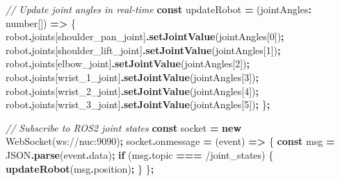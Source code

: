 \documentclass[
]{article}
\newenvironment{Shaded}{\begin{snugshade}}{\end{snugshade}}
\newcommand{\AttributeTok}[1]{\textcolor[rgb]{0.13,0.29,0.53}{#1}}
\newcommand{\BuiltInTok}[1]{#1}
\newcommand{\CommentTok}[1]{\textcolor[rgb]{0.56,0.35,0.01}{\textit{#1}}}
\newcommand{\ControlFlowTok}[1]{\textcolor[rgb]{0.13,0.29,0.53}{\textbf{#1}}}
\newcommand{\DataTypeTok}[1]{\textcolor[rgb]{0.13,0.29,0.53}{#1}}
\newcommand{\DecValTok}[1]{\textcolor[rgb]{0.00,0.00,0.81}{#1}}
\newcommand{\FunctionTok}[1]{\textcolor[rgb]{0.13,0.29,0.53}{\textbf{#1}}}
\newcommand{\KeywordTok}[1]{\textcolor[rgb]{0.13,0.29,0.53}{\textbf{#1}}}
\newcommand{\NormalTok}[1]{#1}
\newcommand{\OperatorTok}[1]{\textcolor[rgb]{0.81,0.36,0.00}{\textbf{#1}}}
\newcommand{\StringTok}[1]{\textcolor[rgb]{0.31,0.60,0.02}{#1}}
\begin{document}
\begin{Shaded}
\begin{Highlighting}[]
  \CommentTok{// Update joint angles in real{-}time}
  \KeywordTok{const}\NormalTok{ updateRobot }\OperatorTok{=}\NormalTok{ (jointAngles}\OperatorTok{:} \DataTypeTok{number}\NormalTok{[]) }\KeywordTok{=\textgreater{}}\NormalTok{ \{}
\NormalTok{    robot}\OperatorTok{.}\AttributeTok{joints}\NormalTok{[}\StringTok{\textquotesingle{}shoulder\_pan\_joint\textquotesingle{}}\NormalTok{]}\OperatorTok{.}\FunctionTok{setJointValue}\NormalTok{(jointAngles[}\DecValTok{0}\NormalTok{])}\OperatorTok{;}
\NormalTok{    robot}\OperatorTok{.}\AttributeTok{joints}\NormalTok{[}\StringTok{\textquotesingle{}shoulder\_lift\_joint\textquotesingle{}}\NormalTok{]}\OperatorTok{.}\FunctionTok{setJointValue}\NormalTok{(jointAngles[}\DecValTok{1}\NormalTok{])}\OperatorTok{;}
\NormalTok{    robot}\OperatorTok{.}\AttributeTok{joints}\NormalTok{[}\StringTok{\textquotesingle{}elbow\_joint\textquotesingle{}}\NormalTok{]}\OperatorTok{.}\FunctionTok{setJointValue}\NormalTok{(jointAngles[}\DecValTok{2}\NormalTok{])}\OperatorTok{;}
\NormalTok{    robot}\OperatorTok{.}\AttributeTok{joints}\NormalTok{[}\StringTok{\textquotesingle{}wrist\_1\_joint\textquotesingle{}}\NormalTok{]}\OperatorTok{.}\FunctionTok{setJointValue}\NormalTok{(jointAngles[}\DecValTok{3}\NormalTok{])}\OperatorTok{;}
\NormalTok{    robot}\OperatorTok{.}\AttributeTok{joints}\NormalTok{[}\StringTok{\textquotesingle{}wrist\_2\_joint\textquotesingle{}}\NormalTok{]}\OperatorTok{.}\FunctionTok{setJointValue}\NormalTok{(jointAngles[}\DecValTok{4}\NormalTok{])}\OperatorTok{;}
\NormalTok{    robot}\OperatorTok{.}\AttributeTok{joints}\NormalTok{[}\StringTok{\textquotesingle{}wrist\_3\_joint\textquotesingle{}}\NormalTok{]}\OperatorTok{.}\FunctionTok{setJointValue}\NormalTok{(jointAngles[}\DecValTok{5}\NormalTok{])}\OperatorTok{;}
\NormalTok{  \}}\OperatorTok{;}

  \CommentTok{// Subscribe to ROS2 joint states}
  \KeywordTok{const}\NormalTok{ socket }\OperatorTok{=} \KeywordTok{new} \BuiltInTok{WebSocket}\NormalTok{(}\StringTok{\textquotesingle{}ws://nuc:9090\textquotesingle{}}\NormalTok{)}\OperatorTok{;}
\NormalTok{  socket}\OperatorTok{.}\AttributeTok{onmessage} \OperatorTok{=}\NormalTok{ (}\BuiltInTok{event}\NormalTok{) }\KeywordTok{=\textgreater{}}\NormalTok{ \{}
    \KeywordTok{const}\NormalTok{ msg }\OperatorTok{=} \BuiltInTok{JSON}\OperatorTok{.}\FunctionTok{parse}\NormalTok{(}\BuiltInTok{event}\OperatorTok{.}\AttributeTok{data}\NormalTok{)}\OperatorTok{;}
    \ControlFlowTok{if}\NormalTok{ (msg}\OperatorTok{.}\AttributeTok{topic} \OperatorTok{===} \StringTok{\textquotesingle{}/joint\_states\textquotesingle{}}\NormalTok{) \{}
      \FunctionTok{updateRobot}\NormalTok{(msg}\OperatorTok{.}\AttributeTok{position}\NormalTok{)}\OperatorTok{;}
\NormalTok{    \}}
\NormalTok{  \}}\OperatorTok{;}


\end{Highlighting}
\end{Shaded}
\end{document}
